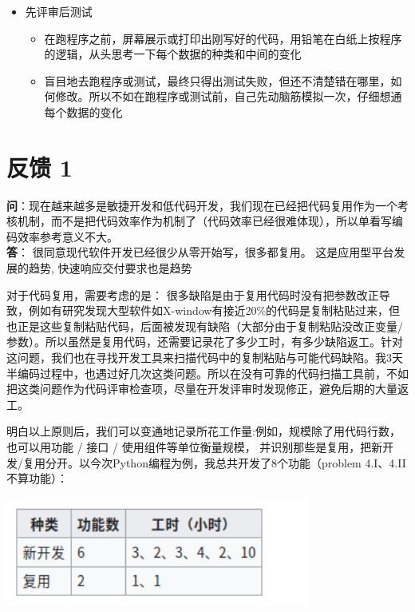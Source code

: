 \begin{itemize}
\tightlist
\item
  先评审后测试

  \begin{itemize}
  \tightlist
  \item
    在跑程序之前，屏幕展示或打印出刚写好的代码，用铅笔在白纸上按程序的逻辑，从头思考一下每个数据的种类和中间的变化
  \item
    盲目地去跑程序或测试，最终只得出测试失败，但还不清楚错在哪里，如何修改。所以不如在跑程序或测试前，自己先动脑筋模拟一次，仔细想通每个数据的变化
  \end{itemize}
\end{itemize}

\hypertarget{ux53cdux9988-1}{%
\section{反馈 1}\label{ux53cdux9988-1}}

\textbf{问}：现在越来越多是敏捷开发和低代码开发，我们现在已经把代码复用作为一个考核机制，而不是把代码效率作为机制了（代码效率已经很难体现），所以单看写编码效率参考意义不大。\\
\textbf{答}： 很同意现代软件开发已经很少从零开始写，很多都复用。
这是应用型平台发展的趋势, 快速响应交付要求也是趋势

对于代码复用，需要考虑的是：
很多缺陷是由于复用代码时没有把参数改正导致，例如有研究发现大型软件如X-window有接近20\%的代码是复制粘贴过来，但也正是这些复制粘贴代码，后面被发现有缺陷（大部分由于复制粘贴没改正变量/参数）。所以虽然是复用代码，还需要记录花了多少工时，有多少缺陷返工。针对这问题，我们也在寻找开发工具来扫描代码中的复制粘贴与可能代码缺陷。我3天半编码过程中，也遇过好几次这类问题。所以在没有可靠的代码扫描工具前，不如把这类问题作为代码评审检查项，尽量在开发评审时发现修正，避免后期的大量返工。

明白以上原则后，我们可以变通地记录所花工作量:例如，规模除了用代码行数，也可以用功能
/ 接口 / 使用组件等单位衡量规模，
并识别那些是复用，把新开发/复用分开。以今次Python编程为例，我总共开发了8个功能（problem
4.I、4.II 不算功能）：


\includegraphics[width=10cm]{Screenshotfrom20221219222055.png}

